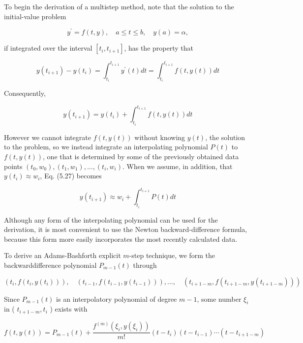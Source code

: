 %

%
To begin the derivation of a multistep method, note that the solution to the initial-value problem

$$
y^{\prime}=f(t, y), \quad a \leq t \leq b, \quad y(a)=\alpha,
$$

if integrated over the interval $\left[t_{i}, t_{i+1}\right]$, has the property that

$$
y\left(t_{i+1}\right)-y\left(t_{i}\right)=\int_{t_{i}}^{t_{i+1}} y^{\prime}(t) d t=\int_{t_{i}}^{t_{i+1}} f(t, y(t)) d t
$$

Consequently,


\begin{equation}\label{eqn:multistepeq7}
y\left(t_{i+1}\right)=y\left(t_{i}\right)+\int_{t_{i}}^{t_{i+1}} f(t, y(t)) d t
\end{equation}


However we cannot integrate $f(t, y(t))$ without knowing $y(t)$, the solution to the problem, so we instead integrate an interpolating polynomial $P(t)$ to $f(t, y(t))$, one that is determined by some of the previously obtained data points $\left(t_{0}, w_{0}\right),\left(t_{1}, w_{1}\right), \ldots,\left(t_{i}, w_{i}\right)$. When we assume, in addition, that $y\left(t_{i}\right) \approx w_{i}$, Eq. (5.27) becomes


\begin{equation}\label{eqn:multistepeq8}
y\left(t_{i+1}\right) \approx w_{i}+\int_{t_{i}}^{t_{i+1}} P(t) d t
\end{equation}


Although any form of the interpolating polynomial can be used for the derivation, it is most convenient to use the Newton backward-difference formula, because this form more easily incorporates the most recently calculated data.

To derive an Adams-Bashforth explicit $m$-step technique, we form the backwarddifference polynomial $P_{m-1}(t)$ through

$$
\left(t_{i}, f\left(t_{i}, y\left(t_{i}\right)\right)\right), \quad\left(t_{i-1}, f\left(t_{i-1}, y\left(t_{i-1}\right)\right)\right), \ldots, \quad\left(t_{i+1-m}, f\left(t_{i+1-m}, y\left(t_{i+1-m}\right)\right)\right)
$$

Since $P_{m-1}(t)$ is an interpolatory polynomial of degree $m-1$, some number $\xi_{i}$ in ( $t_{i+1-m}, t_{i}$ ) exists with

$$
f(t, y(t))=P_{m-1}(t)+\frac{f^{(m)}\left(\xi_{i}, y\left(\xi_{i}\right)\right)}{m!}\left(t-t_{i}\right)\left(t-t_{i-1}\right) \cdots\left(t-t_{i+1-m}\right)
$$


